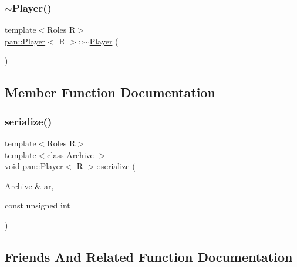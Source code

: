 \mbox{\label{classpan_1_1_player_a7571870e341d4413df5e9253ce36534f}} 
\subsubsection{\texorpdfstring{$\sim$\+Player()}{~Player()}}
{\footnotesize\ttfamily template$<$Roles R$>$ \\
\hyperlink{classpan_1_1_player}{pan\+::\+Player}$<$ R $>$\+::$\sim$\hyperlink{classpan_1_1_player}{Player} (\begin{DoxyParamCaption}{ }\end{DoxyParamCaption})}



\subsection{Member Function Documentation}
\mbox{\label{classpan_1_1_player_a7aa4f9237095b37b3796f98436bca7bc}} 
\subsubsection{\texorpdfstring{serialize()}{serialize()}}
{\footnotesize\ttfamily template$<$Roles R$>$ \\
template$<$class Archive $>$ \\
void \hyperlink{classpan_1_1_player}{pan\+::\+Player}$<$ R $>$\+::serialize (\begin{DoxyParamCaption}\item[{Archive \&}]{ar,  }\item[{const unsigned}]{int }\end{DoxyParamCaption})\hspace{0.3cm}{\ttfamily [inline]}}



\subsection{Friends And Related Function Documentation}
\mbox{\label{classpan_1_1_player_ac98d07dd8f7b70e16ccb9a01abf56b9c}} 

